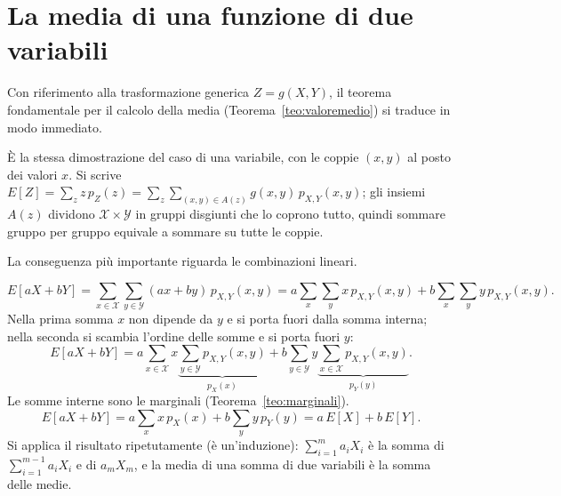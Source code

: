 \section{La media di una funzione di due variabili}

Con riferimento alla trasformazione generica $Z = g(X, Y)$, il teorema fondamentale per il calcolo della media
(Teorema~\ref{teo:valoremedio}) si traduce in modo immediato.


\begin{dimostrazione}
\passo{} È la stessa dimostrazione del caso di una variabile, con le coppie $(x, y)$ al posto dei valori $x$. Si
scrive $E[Z] = \sum_z z\, p_Z(z) = \sum_z \sum_{(x,y) \in A(z)} g(x, y)\, p_{X,Y}(x, y)$; gli insiemi $A(z)$ dividono
$\mathcal{X} \times \mathcal{Y}$ in gruppi disgiunti che lo coprono tutto, quindi sommare gruppo per gruppo equivale a
sommare su tutte le coppie.
\end{dimostrazione}

La conseguenza più importante riguarda le combinazioni lineari.


\begin{dimostrazione}
\[ E[aX + bY] = \sum_{x \in \mathcal{X}} \sum_{y \in \mathcal{Y}} (ax + by)\, p_{X,Y}(x, y)
   = a \sum_{x} \sum_{y} x\, p_{X,Y}(x, y) + b \sum_{x} \sum_{y} y\, p_{X,Y}(x, y) . \]
 Nella prima somma $x$ non dipende da $y$ e si porta fuori dalla somma interna;
nella seconda si scambia l'ordine delle somme e si porta fuori $y$:
\[ E[aX + bY] = a \sum_{x \in \mathcal{X}} x \underbrace{\sum_{y \in \mathcal{Y}} p_{X,Y}(x, y)}_{p_X(x)}
   + b \sum_{y \in \mathcal{Y}} y \underbrace{\sum_{x \in \mathcal{X}} p_{X,Y}(x, y)}_{p_Y(y)} . \]
Le somme interne sono le marginali (Teorema~\ref{teo:marginali}).
\[ E[aX + bY] = a \sum_{x} x\, p_X(x) + b \sum_{y} y\, p_Y(y) = a\,E[X] + b\,E[Y] . \]
 Si applica il risultato ripetutamente (è un'induzione): $\sum_{i=1}^{m} a_i X_i$ è la somma
di $\sum_{i=1}^{m-1} a_i X_i$ e di $a_m X_m$, e la media di una somma di due variabili è la somma delle medie.
\end{dimostrazione}

